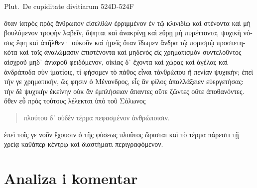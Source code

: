 Plut.\ De cupiditate divitiarum 524D-524F


\medskip


{\large

\begin{greek}

\noindent ὅταν ἰατρὸς πρὸς ἄνθρωπον εἰσελθὼν ἐρριμμένον ἐν τῷ κλινιδίῳ καὶ στένοντα καὶ μὴ βουλόμενον τροφὴν λαβεῖν, ἅψηται καὶ ἀνακρίνῃ καὶ εὕρῃ μὴ πυρέττοντα, ψυχικὴ νόσος ἔφη καὶ ἀπῆλθεν· οὐκοῦν καὶ ἡμεῖς ὅταν ἴδωμεν ἄνδρα τῷ πορισμῷ προστετηκότα καὶ τοῖς ἀναλώμασιν ἐπιστένοντα καὶ μηδενὸς εἰς χρηματισμὸν συντελοῦντος αἰσχροῦ μηδ᾽ ἀνιαροῦ φειδόμενον, οἰκίας δ᾽ ἔχοντα καὶ χώρας καὶ ἀγέλας καὶ ἀνδράποδα σὺν ἱματίοις, τί φήσομεν τὸ πάθος εἶναι τἀνθρώπου ἢ πενίαν ψυχικήν; ἐπεὶ τήν γε χρηματικήν, ὥς φησιν ὁ Μένανδρος, εἷς ἂν φίλος ἀπαλλάξειεν εὐεργετήσας: τὴν δὲ ψυχικὴν ἐκείνην οὐκ ἂν ἐμπλήσειαν ἅπαντες οὔτε ζῶντες οὔτε ἀποθανόντες. ὅθεν εὖ πρὸς τούτους λέλεκται ὑπὸ τοῦ Σόλωνος 
\begin{verse}
πλούτου δ᾽ οὐδὲν τέρμα πεφασμένον ἀνθρώποισιν.
\end{verse}
ἐπεὶ τοῖς γε νοῦν ἔχουσιν ὁ τῆς φύσεως πλοῦτος ὥρισται καὶ τὸ τέρμα πάρεστι τῇ χρείᾳ καθάπερ κέντρῳ καὶ διαστήματι περιγραφόμενον.

\end{greek}

}


\section*{Analiza i komentar}


